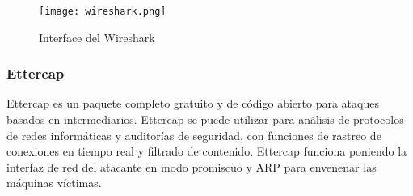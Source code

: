 \begin{center}
    \begin{figure}   
       \begin{center}
          \texttt{[image: wireshark.png]}
       \end{center}
       \caption{Interface del Wireshark}
    \end{figure}
 \end{center}
 
\subsubsection*{Ettercap}

Ettercap es un paquete completo gratuito y de código abierto para ataques basados 
en intermediarios. Ettercap se puede utilizar para análisis de protocolos de redes 
informáticas y auditorías de seguridad, con funciones de rastreo de conexiones en 
tiempo real y filtrado de contenido. Ettercap funciona poniendo la interfaz de red 
del atacante en modo promiscuo y ARP para envenenar las máquinas víctimas.

